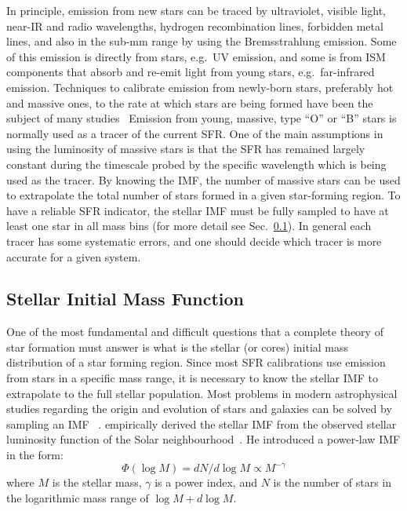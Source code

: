 In principle, emission from new stars can be traced by ultraviolet, visible light, near-IR and radio wavelengths, hydrogen recombination lines, forbidden metal lines, and also in the sub-mm range by using the Bremsstrahlung emission. 
Some of this emission is directly from stars, e.g.\ UV emission, and some is from ISM components that absorb and re-emit light from young stars, e.g.\ far-infrared emission.
Techniques to calibrate emission from newly-born stars, preferably hot and massive ones, to the rate at which stars are being formed have been the subject of many studies~\citep[e.g.][]{Calzetti07, Kennicutt11, Hao11,Bigiel08} 
Emission from young, massive, type ``O'' or ``B'' stars is normally used as a tracer of the current SFR. %
One of the main assumptions in using the luminosity of massive stars is that the SFR has remained largely constant during the timescale probed by the specific wavelength which is being used as the tracer. 
By knowing the IMF, the number of massive stars can be used to extrapolate the total number of stars formed in a given star-forming region.
To have a reliable SFR indicator, the stellar IMF must be fully sampled to have at least one star in all mass bins (for more detail see Sec.~\ref{sec: imf}).
In general each tracer has some systematic errors, and one should decide which tracer is more accurate for a given system. 

\subsection{Stellar Initial Mass Function}
\label{sec: imf}
One of the most fundamental and difficult questions that a complete theory of star formation must answer is what is the stellar (or cores) initial mass distribution of a star forming region. %
Since most SFR calibrations use emission from stars in a specific mass range, it is necessary to know the stellar IMF to extrapolate to the full stellar population.
Most problems in modern astrophysical studies regarding the origin and evolution of stars and galaxies can be solved by sampling an IMF ~\citep{Bastin10}. %
\cite{Salpeter55} empirically derived the stellar IMF from the observed stellar luminosity function of the Solar neighbourhood~\citep{Shu87}. 
He introduced a power-law IMF in the form:
\begin{equation}
\label{equ: salp}
\Phi (\log M) = dN / d \log M \propto M^{-\gamma }
\end{equation} 
where $M$ is the stellar mass, $\gamma$ is a power index, and $N$ is the number of stars in the logarithmic mass range of $\log M + d\log M$. %


